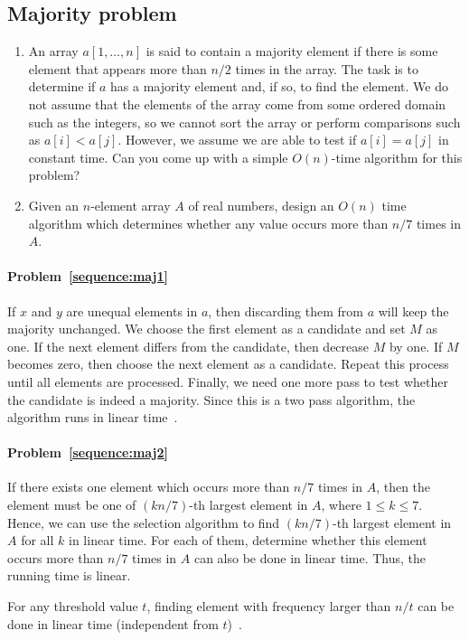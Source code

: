 \subsection{Majority problem}
\begin{Exercise}
\begin{enumerate}
\item An array $a[1, \dots, n]$ is said to contain a majority element if there is some element that appears more than $n/2$ times in the array. The task is to determine if $a$ has a majority element and, if so, to find the element. We do not assume that the elements of the array come from some ordered domain such as the integers, so we cannot sort the array or perform comparisons such as $a[i] < a[j]$. However, we assume we are able to test if $a[i] = a[j]$ in constant time. Can you come up with a simple $O(n)$-time algorithm for this problem? \label{sequence:maj1} 
\item Given an $n$-element array $A$ of real numbers, design an $O(n)$ time algorithm which determines whether any value occurs more than $n/7$ times in $A$. \label{sequence:maj2}
\end{enumerate}
\end{Exercise}

\begin{Answer}
\paragraph{Problem~\ref{sequence:maj1}}
If $x$ and $y$ are unequal elements in $a$, then discarding them from $a$ will keep the majority unchanged. We choose the first element as a candidate and set $M$ as one. If the next element differs from the candidate, then decrease $M$ by one. If $M$ becomes zero, then choose the next element as a candidate. Repeat this process until all elements are processed. Finally, we need one more pass to test whether the candidate is indeed a majority. Since this is a two pass algorithm, the algorithm runs in linear time~\cite{Misra1982}.

\paragraph{Problem~\ref{sequence:maj2}}
If there exists one element which occurs more than $n/7$ times in $A$, then the element must be one of $(kn/7)$-th largest element in $A$, where $1 \leq k \leq 7$. Hence, we can use the selection algorithm to find $(kn/7)$-th largest element in $A$ for all $k$ in linear time. For each of them, determine whether this element occurs more than $n/7$ times in $A$ can also be done in linear time. Thus, the running time is linear.

For any threshold value $t$, finding element with frequency larger than $n/t$ can be done in linear time (independent from $t$)~\cite{Karp2003}.
\end{Answer}

